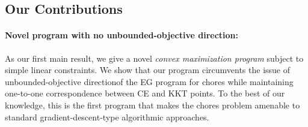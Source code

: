 \documentclass[format=acmsmall,authorversion]{acmart}
\newcommand{\notename}[2]{{\textcolor{blue}{\footnotesize{\bf (#1:} {#2}{\bf ) }}}}
\newcommand{\RM}[1]{{\notename{RM}{#1}}}
\newcommand{\infd}{unbounded-objective direction}
\begin{document}


 




\subsection{Our Contributions}

\paragraph{Novel program with no \infd:} As our first main result, we give a novel {\em convex maximization program} subject to simple linear constraints. We show that our program circumvents the issue of \infd of the EG program for chores while maintaining one-to-one correspondence between CE and  KKT points. To the best of our knowledge, this is the first program that makes the chores problem amenable to standard gradient-descent-type algorithmic approaches.

\end{document}
